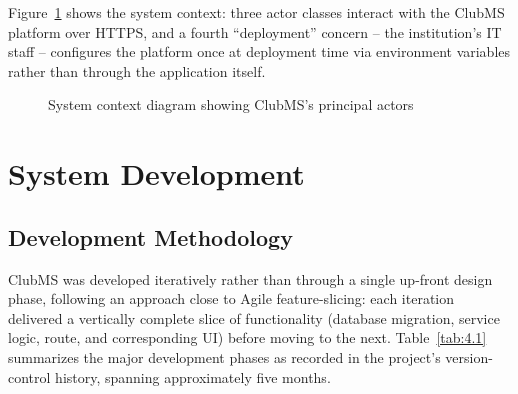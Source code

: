 \documentclass[12pt,oneside]{book}
\begin{document}
Figure~\ref{fig:3.1} shows the system context: three actor classes interact with the ClubMS platform over HTTPS, and a fourth ``deployment'' concern -- the institution's IT staff -- configures the platform once at deployment time via environment variables rather than through the application itself.

\begin{figure}[H]
\centering
{}
\caption{System context diagram showing ClubMS's principal actors}
\label{fig:3.1}
\end{figure}


\chapter{System Development}

\section{Development Methodology}

ClubMS was developed iteratively rather than through a single up-front design phase, following an approach close to Agile feature-slicing: each iteration delivered a vertically complete slice of functionality (database migration, service logic, route, and corresponding UI) before moving to the next. Table~\ref{tab:4.1} summarizes the major development phases as recorded in the project's version-control history, spanning approximately five months.
\end{document}
